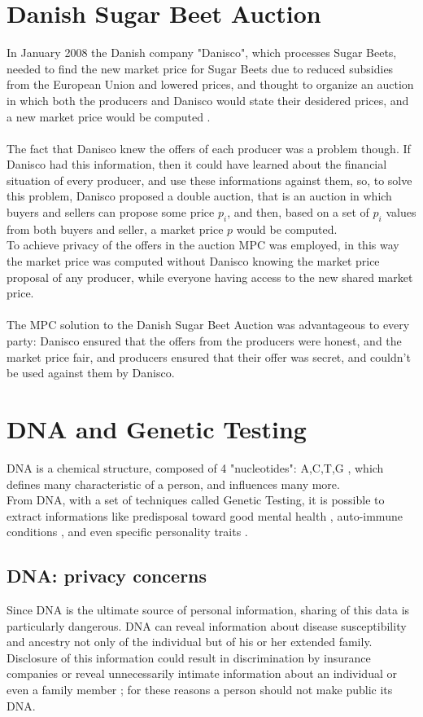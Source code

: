 \documentclass[12pt]{article}
\begin{document}
\section{Danish Sugar Beet Auction}
In January 2008 the Danish company "Danisco", which processes Sugar Beets, needed to find the new market price for Sugar Beets due to reduced subsidies from the European Union and lowered prices, and thought to organize an auction in which both the producers and Danisco would state their desidered prices, and a new market price would be computed \cite{sealed_bid:wikipedia}.\\
\\
 The fact that Danisco knew the offers of each producer was a problem though. If Danisco had this information, then it could have learned about the financial situation of every producer, and use these informations against them, 
 so, to solve this problem, Danisco proposed a double auction, that is an auction in which buyers and sellers can propose some price $p_i$, and then, based on a set of $p_i$ values from both buyers and seller, a market price $p$ would be computed.\\
 To achieve privacy of the offers in the auction MPC was employed, in this way the market price was computed without Danisco knowing the market price proposal of any producer, while everyone having access to the new shared market price.\\
 \\
 The MPC solution to the Danish Sugar Beet Auction was advantageous to every party: Danisco ensured that the offers from the producers were honest, and the market price fair, and producers ensured that their offer was secret, and couldn't be used against them by Danisco.

\newpage
\section{DNA and Genetic Testing}
\label{sec:section_3}
DNA is a chemical structure, composed of 4 "nucleotides": A,C,T,G , which defines many characteristic of a person, and influences many more.\\
From DNA, with a set of techniques called Genetic Testing, it is possible to extract informations like predisposal toward good mental health \cite{nature:mental_health}, auto-immune conditions \cite{nature:autoimmune}, and even specific personality traits \cite{genetic_personality}. 
\subsection{DNA: privacy concerns}
Since DNA is the ultimate source of personal information,
sharing of this data is particularly dangerous. DNA can reveal
information about disease susceptibility and ancestry not only
of the individual but of his or her extended family. Disclosure
of this information could result in discrimination by insurance
companies or reveal unnecessarily intimate information about
an individual or even a family member \cite{genetic_testing}; for these reasons 
a person should not make public its DNA.
\end{document}
